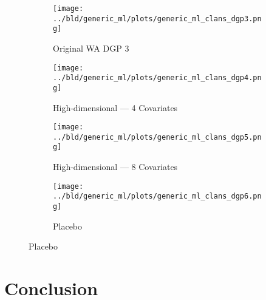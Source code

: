 \documentclass[11pt, a4paper, leqno]{article}
\begin{document}
\begin{figure}
    \caption{Simulation Results: Generic ML --- CLANS}\label{fig:clans}

    \centering
     \begin{subfigure}[b]{0.475\textwidth}
         \centering
         \texttt{[image: ../bld/generic\_ml/plots/generic\_ml\_clans\_dgp3.png]}
         \caption{Original WA DGP 3}\label{fig_clans:dgp3}
     \end{subfigure}
     \hfill
     \begin{subfigure}[b]{0.475\textwidth}
         \centering
         \texttt{[image: ../bld/generic\_ml/plots/generic\_ml\_clans\_dgp4.png]}
         \caption{High-dimensional --- 4 Covariates}\label{fig_clans:dgp4}
     \end{subfigure}

     \begin{subfigure}[b]{0.475\textwidth}
         \centering
         \texttt{[image: ../bld/generic\_ml/plots/generic\_ml\_clans\_dgp5.png]}
         \caption{High-dimensional --- 8 Covariates}\label{fig_clans:dgp5}
     \end{subfigure}
     \begin{subfigure}[b]{0.475\textwidth}
         \centering
         \texttt{[image: ../bld/generic\_ml/plots/generic\_ml\_clans\_dgp6.png]}
         \caption{Placebo}\label{fig_clans:dgp6}
     \end{subfigure}



\end{figure}

\section{Conclusion}

\clearpage
\newpage

\printbibliography
{}


\end{document}
